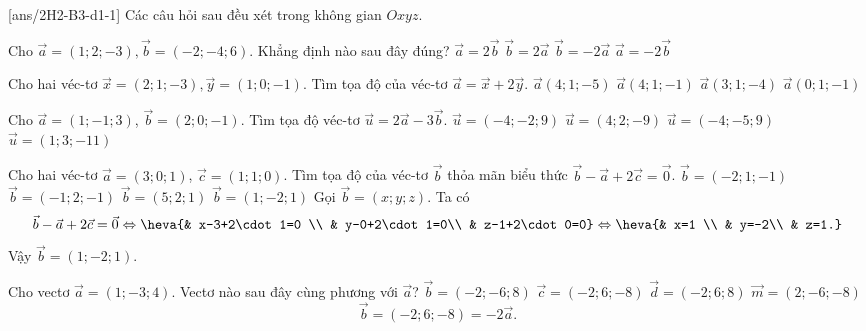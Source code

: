 \BTTN
{}[ans/2H2-B3-d1-1]
Các câu hỏi sau đều xét trong không gian $Oxyz$.
\begin{ex}
	Cho $\vec{a}=(1;2;-3),\vec{b}=(-2;-4;6)$. Khẳng định nào sau đây đúng?
	\choice
	{$\vec{a}=2\vec{b}$}
	{$\vec{b}=2\vec{a}$}
	{\True $\vec{b}=-2\vec{a}$}
	{$\vec{a}=-2\vec{b}$}
\end{ex} 

\begin{ex}
	Cho hai véc-tơ $\vec{x}=(2;1;-3),\vec{y}=(1;0;-1)$. Tìm tọa độ của véc-tơ $\vec{a}=\vec{x}+2\vec{y}$.
	\choice
	{\True $\vec{a}(4;1;-5)$}
	{$\vec{a}(4;1;-1)$}
	{$\vec{a}(3;1;-4)$}
	{$\vec{a}(0;1;-1)$}
\end{ex} 

\begin{ex}
	Cho $\vec{a}=(1;-1;3)$, $\vec{b}=(2;0;-1)$. Tìm tọa độ véc-tơ $\vec{u}=2\vec{a}-3\vec{b}$.
	\choice
	{\True $\vec{u}=(-4;-2;9)$}
	{$\vec{u}=(4;2;-9)$}
	{$\vec{u}=(-4;-5;9)$}
	{$\vec{u}=(1;3;-11)$}
\end{ex} 

\begin{ex}
	Cho hai véc-tơ  $\vec{a}=(3;0;1)$,  $\vec{c}=(1;1;0)$. Tìm tọa độ của véc-tơ $\vec{b}$ thỏa mãn biểu thức  $\vec{b}-\vec{a}+2\vec{c}=\vec{0}$.
	\choice
	{$\vec{b}=(-2;1;-1)$}
	{$\vec{b}=(-1;2;-1)$}
	{$\vec{b}=(5;2;1)$}
	{\True $\vec{b}=(1;-2;1)$}
	\loigiai
	{Gọi $\vec{b}=\left(x; y; z\right)$. Ta có
		$$\vec{b}-\vec{a}+2\vec{c}=\vec{0}\Leftrightarrow\heva{& x-3+2\cdot 1=0 \\ & y-0+2\cdot 1=0\\ & z-1+2\cdot 0=0}\Leftrightarrow\heva{& x=1 \\ & y=-2\\ & z=1.}$$
		Vậy $\vec{b}=(1;-2;1)$.
	}
\end{ex} 

\begin{ex}
	Cho vectơ $\vec{a}=(1;-3;4)$. Vectơ  nào sau đây cùng phương với $\vec{a}$?
	\choice
	{$\vec{b}=(-2;-6;8)$}
	{\True $\vec{c}=(-2;6;-8)$}
	{$\vec{d}=(-2;6;8)$}
	{$\vec{m}=(2;-6;-8)$}
	\loigiai
	{
		$$\vec{b}=(-2;6;-8)=-2\vec{a}.$$
	}
\end{ex} 

